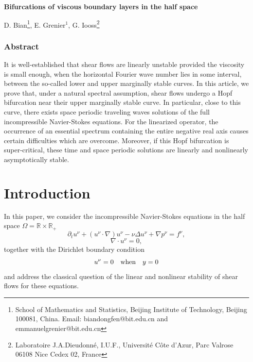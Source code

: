\documentclass[11pt]{article}
\def\beq{\begin{equation}}
\def\eeq{\end{equation}}
\def\rit{\mathbb{R}}
\begin{document}
\centerline{\Large \bf Bifurcations of viscous boundary layers in the half space}

\bigskip

\centerline{D. Bian\footnote{School of Mathematics and Statistics, Beijing Institute of Technology, Beijing 100081, China. Email: biandongfen@bit.edu.cn and emmanuelgrenier@bit.edu.cn}, 
E. Grenier$^1$,
G. Iooss\footnote{Laboratoire J.A.Dieudonné, I.U.F.,
Université Côte d’Azur,
Parc Valrose
06108 Nice Cedex 02, France}}

 



\subsubsection*{Abstract}



It is well-established that shear flows are linearly unstable provided the viscosity is small enough, 
when the horizontal Fourier wave number lies in some interval, 
between the so-called lower and upper marginally stable curves.
In this article, we prove that, under a natural spectral assumption, 
shear flows undergo a Hopf bifurcation near their upper marginally stable curve.
In particular, close to this curve, there exists space periodic traveling waves solutions of the full incompressible
Navier-Stokes equations.
For the linearized operator, the occurrence of an essential spectrum containing the entire negative real axis causes certain difficulties which are overcome. 
Moreover, if this Hopf bifurcation is super-critical, these time and space periodic solutions are linearly
and nonlinearly asymptotically stable.






\section{Introduction}





In this paper, we consider the incompressible Navier-Stokes equations in the half space $\Omega = \rit \times \rit_+$
 \beq \label{NS1} 
\partial_t u^\nu + (u^\nu \cdot \nabla) u^\nu - \nu \Delta u^\nu + \nabla p^\nu = f^\nu,
\eeq
\beq \label{NS2}
\nabla \cdot u^\nu = 0 ,
\eeq
together with the Dirichlet boundary condition
\beq \label{NS3} 
u^\nu = 0 \quad \hbox{when} \quad y = 0
\eeq
and address the classical question of the linear and nonlinear stability of shear flows for these equations.
\end{document}
